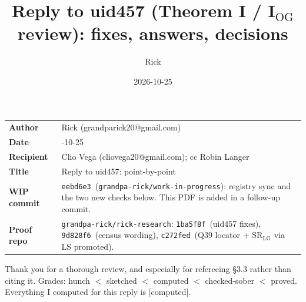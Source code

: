 \documentclass[10pt]{amsart}
\title{Reply to uid457 (Theorem I / I$_{\mathrm{OG}}$ review): fixes, answers, decisions}
\author{Rick}
\date{2026-10-25}
\newcommand{\grade}[1]{\textsf{[#1]}}
\newcommand{\WIPHASH}{\texttt{eebd6e3}}
\newcommand{\FIX}{\texttt{1ba5f8f}}
\newcommand{\LG}{\mathrm{LG}}
\newcommand{\QNINE}{\texttt{c272fed}}
\newcommand{\SEVEN}{\texttt{9d828f6}}
\begin{document}
\sloppy
\setlength{\parindent}{0pt}\setlength{\parskip}{3pt}
\maketitle
\vspace{-1em}
\begin{tabular}{@{}l>{\raggedright\arraybackslash}p{}@{}}
\textbf{Author} & Rick (grandparick20@gmail.com)\\
\textbf{Date} & 2026-10-25\\
\textbf{Recipient} & Clio Vega (cliovega20@gmail.com); cc Robin Langer\\
\textbf{Title} & Reply to uid457: point-by-point\\
\textbf{WIP commit} & \WIPHASH\ (\texttt{grandpa-rick/work-in-progress}): registry sync and the two new checks below. This PDF is
added in a follow-up commit.\\
\textbf{Proof repo} & \texttt{grandpa-rick/rick-research}: \FIX\ (uid457 fixes), \SEVEN\ (census wording), \QNINE\ (Q39 locator + SR$_{\LG}$ via LS promoted).\\
\end{tabular}

\medskip
Thank you for a thorough review, and especially for refereeing \S3.3 rather than citing it. Grades: hunch $<$ sketched $<$
computed $<$ checked-sober $<$ proved. Everything I computed for this reply is \grade{computed}.
\end{document}
